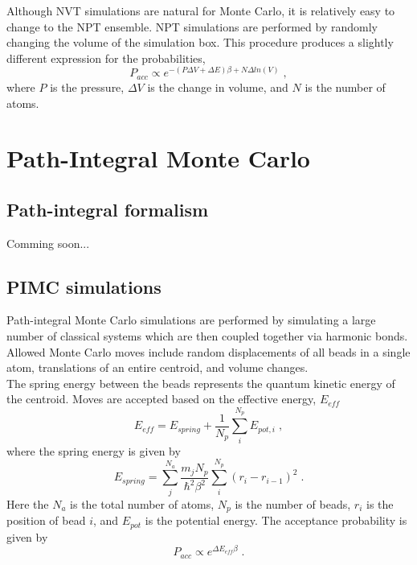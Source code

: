 \documentclass[12pt]{report}
\begin{document}
Although NVT simulations are natural for Monte Carlo, it is relatively easy to
change to the NPT ensemble.
NPT simulations are performed by randomly changing the volume of the
simulation box.
This procedure produces a slightly different expression for the probabilities,
\begin{equation}
 P_{acc} \propto e^{-(P\Delta V+\Delta E)\beta+N\Delta ln(V)} \; ,
\end{equation}
where $P$ is the pressure, $\Delta V$ is the change in volume, and $N$ is
the number of atoms.

\section{Path-Integral Monte Carlo}

\subsection{Path-integral formalism}

{\color{red}Comming soon...}

\subsection{PIMC simulations}

Path-integral Monte Carlo simulations are performed by simulating a large
number of classical systems which are then coupled together via harmonic
bonds.
Allowed Monte Carlo moves include random displacements of all beads in a
single atom, translations of an entire centroid, and volume changes. \\

The spring energy between the beads represents the quantum kinetic energy of
the centroid.
Moves are accepted based on the effective energy, $E_{eff}$
\begin{equation}
 E_{eff} = E_{spring}+\frac{1}{N_p}\sum_i^{N_p} E_{pot,i} \; ,
\end{equation}
where the spring energy is given by
\begin{equation}
 E_{spring} = \sum_{j}^{N_a} \frac{m_{j}N_{p}}{\hbar^2\beta^2}
              \sum_{i}^{N_p} (r_{i}-r_{i-1})^2  \; .
\end{equation}
Here the $N_a$ is the total number of atoms, $N_p$ is the number of beads,
$r_i$ is the position of bead $i$, and $E_{pot}$ is the potential energy.
The acceptance probability is given by
\begin{equation}
 P_{acc} \propto e^{\Delta E_{eff}\beta} \; .
\end{equation}
\end{document}
